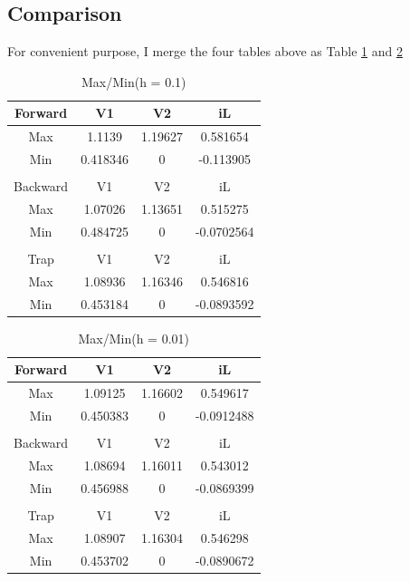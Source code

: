 \documentclass{article}
\begin{document}
\subsection{Comparison}
For convenient purpose, I merge the four tables above as Table \ref{tab:all 01} and \ref{tab:all 001}
\begin{table}[H]
    \begin{center}
        \begin{tabular}{|c|c|c|c|}
            \hline
            Forward & V1 & V2 & iL \\ \hline
            Max & 1.1139 & 1.19627 & 0.581654 \\ \hline
            Min & 0.418346 & 0 & -0.113905 \\ \hline
              &  &  &  \\ \hline
              Backward & V1 & V2 & iL \\ \hline
              Max & 1.07026 & 1.13651 & 0.515275 \\ \hline
              Min & 0.484725 & 0 & -0.0702564 \\ \hline
               &  &  &  \\ \hline
               Trap & V1 & V2 & iL \\ \hline
               Max & 1.08936 & 1.16346 & 0.546816 \\ \hline
               Min & 0.453184 & 0 & -0.0893592 \\ \hline
        \end{tabular}
    \end{center}
    \caption{Max/Min(h = 0.1)}
    \label{tab:all 01}
\end{table}
\begin{table}[H]
    \begin{center}
        \begin{tabular}{|c|c|c|c|}
            \hline
            Forward & V1 & V2 & iL \\ \hline
            Max & 1.09125 & 1.16602 & 0.549617 \\ \hline
            Min & 0.450383 & 0 & -0.0912488 \\ \hline
              &  &  &  \\ \hline
              Backward & V1 & V2 & iL \\ \hline
              Max & 1.08694 & 1.16011 & 0.543012 \\ \hline
              Min & 0.456988 & 0 & -0.0869399 \\ \hline
               &  &  &  \\ \hline
               Trap & V1 & V2 & iL \\ \hline
               Max & 1.08907 & 1.16304 & 0.546298 \\ \hline
               Min & 0.453702 & 0 & -0.0890672 \\ \hline
        \end{tabular}
    \end{center}
    \caption{Max/Min(h = 0.01)}
    \label{tab:all 001}
\end{table}
\end{document}
